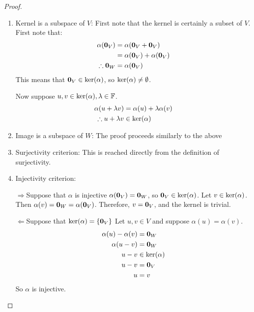 \documentclass[../Main.tex]{subfiles}
\begin{document}
\begin{proof}
    \begin{enumerate}
        \item Kernel is a subspace of $V$:
            First note that the kernel is certainly a subset of $V$. First note that:
            \begin{align*}
                \alpha(\boldsymbol{0}_V) &= \alpha(\boldsymbol{0}_V + \boldsymbol{0}_V) \\
                &= \alpha(\boldsymbol{0}_V) + \alpha(\boldsymbol{0}_V) \\
                \therefore \boldsymbol{0}_W &= \alpha(\boldsymbol{0}_V)
            \end{align*}
            This means that $\boldsymbol{0}_V \in \ker(\alpha)$, so $\ker(\alpha) \neq \emptyset$.

            Now suppose $u, v \in \ker(\alpha), \lambda \in \mathbb{F}$.
            \begin{align*}
                \alpha(u + \lambda v) &= \alpha(u) + \lambda \alpha(v) \\
                \therefore u + \lambda v &\in \ker(\alpha)
            \end{align*}
        \item Image is a subspace of $W$:
            The proof proceeds similarly to the above
        \item Surjectivity criterion:
            This is reached directly from the definition of surjectivity.
        \item Injectivity criterion:
            \begin{proofdirection}{$\Rightarrow$}{Suppose that $\alpha$ is injective}
                $\alpha(\boldsymbol{0}_V) = \boldsymbol{0}_W$, so $\boldsymbol{0}_V \in \ker(\alpha)$. Let $v \in \ker(\alpha)$. Then $\alpha(v) = \boldsymbol{0}_W = \alpha(\boldsymbol{0}_V)$. Therefore, $v = \boldsymbol{0}_V$, and the kernel is trivial.
            \end{proofdirection}            
            \begin{proofdirection}{$\Leftarrow$}{Suppose that $\ker(\alpha) = \{\boldsymbol{0}_V\}$}
                Let $u, v \in V$ and suppose $\alpha(u) = \alpha(v)$.
                \begin{align*}
                    \alpha(u) - \alpha(v) &= \boldsymbol{0}_W \\
                    \alpha(u - v) &= \boldsymbol{0}_W \\
                    u - v &\in \ker(\alpha) \\
                    u - v &= \boldsymbol{0}_V \\
                    u &= v
                \end{align*}
                So $\alpha$ is injective.
            \end{proofdirection}
    \end{enumerate}
\end{proof}
\end{document}
